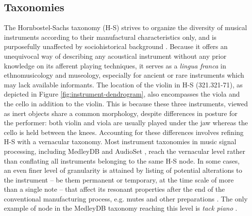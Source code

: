 \documentclass{article}
\makeatletter
\newcommand*{\eg}{e.g.\@\xspace}
\makeatother
\begin{document}
\subsection{Taxonomies}
The Hornbostel-Sachs taxonomy (H-S) strives to organize the diversity of musical instruments according to their manufactural characteristics only, and is purposefully unaffected by sociohistorical background \cite{montagu2009muzyka}.
Because it offers an unequivocal way of describing any acoustical instrument without any prior knowledge on its afferent playing techniques, it serves as a \emph{lingua franca} in ethnomusicology and museology, especially for ancient or rare instruments which may lack available informants.
The location of the violin in H-S (321.321-71), as depicted in Figure \ref{fig:instrument-dendrogram}, also encompasses the viola and the cello in addition to the violin.
This is because these three instruments, viewed as inert objects share a common morphology, despite differences in posture for the performer: both violin and viola are usually played under the jaw whereas the cello is held between the knees.
Accounting for these differences involves refining H-S with a vernacular taxonomy.
Most instrument taxonomies in music signal processing, including MedleyDB and AudioSet \cite{gemmeke2017icassp}, reach the vernacular level rather than conflating all instruments belonging to the same H-S node.
In some cases, an even finer level of granularity is attained by listing of potential alterations to the instrument -- be them permanent or temporary, at the time scale of more than a single note -- that affect its resonant properties after the end of the conventional manufacturing process, \eg{} mutes and other preparations \cite{dianova2007phd}.
The only example of node in the MedleyDB taxonomy reaching this level is \emph{tack piano} \cite{bittner2014ismir} .
\end{document}
